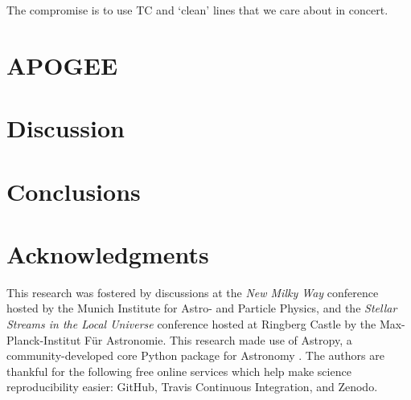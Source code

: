\documentclass[useAMS,usenatbib]{mn2e}
\begin{document}



The compromise is to use TC and `clean' lines that we care about in concert.








\section{APOGEE}





\section{Discussion}





\section{Conclusions}

% 


\section*{Acknowledgments}
This research was fostered by discussions at the \textit{New Milky Way}
conference hosted by the Munich Institute for Astro- and Particle Physics, and
the \textit{Stellar Streams in the Local Universe} conference hosted at Ringberg
Castle by the Max-Planck-Institut F\"ur Astronomie. This research made use of 
Astropy, a community-developed core Python package for Astronomy \citep{astropy}.
The authors are thankful for the following free online services which help make
science reproducibility easier: GitHub, Travis Continuous Integration, and Zenodo.
\end{document}
